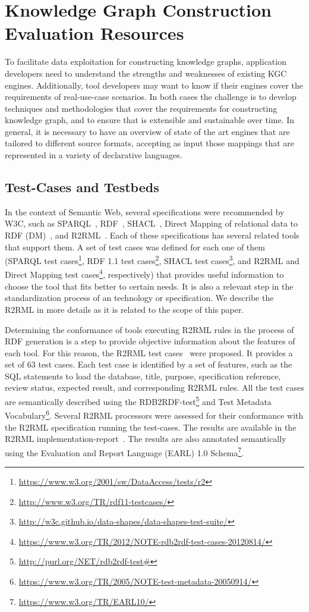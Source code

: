 \section{Knowledge Graph Construction Evaluation Resources}
\label{sec:soa_evaluations}
To facilitate data exploitation for constructing knowledge graphs, application developers need to understand the strengths and weaknesses of existing KGC engines. Additionally, tool developers may want to know if their engines cover the requirements of real-use-case scenarios. In both cases the challenge is to develop techniques and methodologies that cover the requirements for constructing knowledge graph, and to ensure that is extensible and sustainable over time. In general, it is necessary to have an overview of state of the art engines that are tailored to different source formats, accepting as input those mappings that are represented in a variety of declarative languages.


\subsection{Test-Cases and Testbeds}
In the context of Semantic Web, several specifications were recommended by W3C, such as SPARQL~\citep{SPARQL}, RDF~\citep{RDF}, SHACL~\citep{SHACL}, Direct Mapping of relational data to RDF (DM)~\citep{directMapping}, and R2RML~\citep{R2RML}. Each of these specifications has several related tools that support them. A set of test cases was defined for each one of them (SPARQL test cases\footnote{ \url{https://www.w3.org/2001/sw/DataAccess/tests/r2}}, RDF 1.1 test cases\footnote{ \url{http://www.w3.org/TR/rdf11-testcases/}}, SHACL test cases\footnote{ \url{http://w3c.github.io/data-shapes/data-shapes-test-suite/}}, and R2RML and Direct Mapping test cases\footnote{\url{https://www.w3.org/TR/2012/NOTE-rdb2rdf-test-cases-20120814/}}, respectively) that provides useful information to choose the tool that fits better to certain needs. It is also a relevant step in the standardization process of an technology or specification. We describe the R2RML in more details as it is related to the scope of this paper.

Determining the conformance of tools executing R2RML rules in the process of RDF generation is a step to provide objective information about the features of each tool. For this reason, the R2RML test cases~\citep{R2RML_test_cases} were proposed. It provides a set of 63 test cases. Each test case is identified by a set of features, such as the SQL statements to load the database, title, purpose, specification reference, review status, expected result, and corresponding R2RML rules. All the test cases are semantically described using the RDB2RDF-test\footnote{\url{http://purl.org/NET/rdb2rdf-test\#}} and Test Metadata Vocabulary\footnote{\url{https://www.w3.org/TR/2005/NOTE-test-metadata-20050914/}}. Several R2RML processors were assessed for their conformance with the R2RML specification running the test-cases. The results are available in the R2RML implementation-report~\citep{R2RML_implementation_report}. The results are also annotated semantically using the Evaluation and Report Language (EARL) 1.0 Schema\footnote{\url{https://www.w3.org/TR/EARL10/}}.

